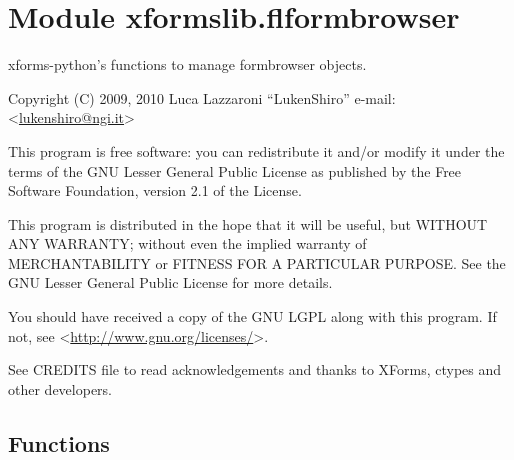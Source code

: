 %
%
%


\section{Module xformslib.flformbrowser}

    \label{xformslib:flformbrowser}

xforms-python's functions to manage formbrowser objects.

Copyright (C) 2009, 2010  Luca Lazzaroni ``LukenShiro''
e-mail: <\href{mailto:lukenshiro@ngi.it}{lukenshiro@ngi.it}>

This program is free software: you can redistribute it and/or modify
it under the terms of the GNU Lesser General Public License as
published by the Free Software Foundation, version 2.1 of the License.

This program is distributed in the hope that it will be useful,
but WITHOUT ANY WARRANTY; without even the implied warranty of
MERCHANTABILITY or FITNESS FOR A PARTICULAR PURPOSE. See the
GNU Lesser General Public License for more details.

You should have received a copy of the GNU LGPL along with this
program. If not, see <\href{http://www.gnu.org/licenses/}{http://www.gnu.org/licenses/}>.

See CREDITS file to read acknowledgements and thanks to XForms,
ctypes and other developers.


  \subsection{Functions}

    \label{xformslib:flformbrowser:fl_addto_formbrowser}

